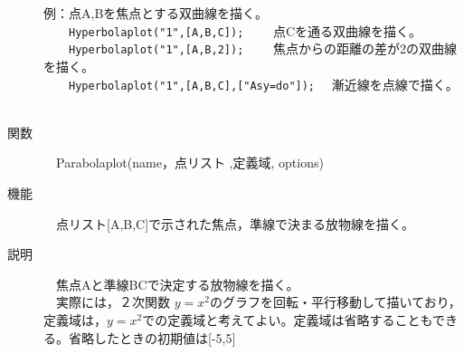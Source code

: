 \documentclass[papersize,a4paper,12pt,uplatex]{jsarticle}
\begin{document}
\begin{description}
例：点A,Bを焦点とする双曲線を描く。\\
　　\verb|Hyperbolaplot("1",[A,B,C]);| 　　点Cを通る双曲線を描く。\\
　　\verb|Hyperbolaplot("1",[A,B,2]);|  　　焦点からの距離の差が2の双曲線を描く。\\
　　\verb|Hyperbolaplot("1",[A,B,C],["Asy=do"]);| 　漸近線を点線で描く。\\

　　　　　\\

\hypertarget{parabolaplot}{}
\item[関数]　Parabolaplot(name，点リスト ,定義域, options)
\item[機能]　点リスト[A,B,C]で示された焦点，準線で決まる放物線を描く。
\item[説明]　焦点Aと準線BCで決定する放物線を描く。\\
　実際には，２次関数 $y=x^2$のグラフを回転・平行移動して描いており，定義域は，$y=x^2$での定義域と考えてよい。定義域は省略することもできる。省略したときの初期値は[-5,5]\\


\end{description}
\end{document}
